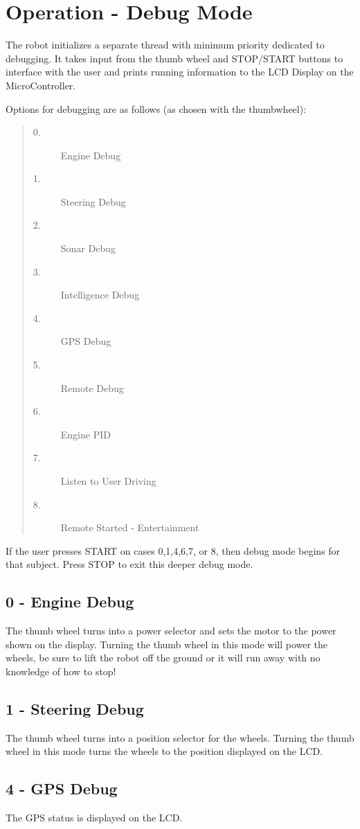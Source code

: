 \documentclass[12pt]{article}
\begin{document}
\clearpage
\section{Operation - Debug Mode}
The robot initializes a separate thread with minimum priority dedicated to debugging.  It takes input from the thumb wheel and STOP/START buttons to interface with the user and prints running information to the LCD Display on the MicroController.

Options for debugging are as follows (as chosen with the thumbwheel):
\begin{quote}
\begin{description}
\item[0.] Engine Debug
\item[1.] Steering Debug
\item[2.] Sonar Debug
\item[3.] Intelligence Debug
\item[4.] GPS Debug
\item[5.] Remote Debug
\item[6.] Engine PID
\item[7.] Listen to User Driving
\item[8.] Remote Started - Entertainment
\end{description}
\end{quote}

If the user presses START on cases 0,1,4,6,7, or 8, then debug mode begins for that subject.  Press STOP to exit this deeper debug mode.

\subsection*{0 - Engine Debug}
The thumb wheel turns into a power selector and sets the motor to the power shown on the display.  Turning the thumb wheel in this mode will power the wheels, be sure to lift the robot off the ground or it will run away with no knowledge of how to stop!

\subsection*{1 - Steering Debug}
The thumb wheel turns into a position selector for the wheels.  Turning the thumb wheel in this mode turns the wheels to the position displayed on the LCD.

\subsection*{4 - GPS Debug}
The GPS status is displayed on the LCD.
\end{document}
